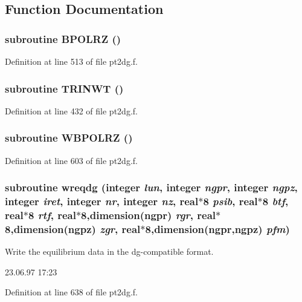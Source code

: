 \subsection{Function Documentation}
\hypertarget{pt2dg_8f_6512103c7c194607f9a5868f70673f38}{
\subsubsection[BPOLRZ]{\setlength{\rightskip}{0pt plus 5cm}subroutine BPOLRZ ()}}
\label{pt2dg_8f_6512103c7c194607f9a5868f70673f38}




Definition at line 513 of file pt2dg.f.\hypertarget{pt2dg_8f_b954ece6618d5879ab91cf37b0735a5a}{
\subsubsection[TRINWT]{\setlength{\rightskip}{0pt plus 5cm}subroutine TRINWT ()}}
\label{pt2dg_8f_b954ece6618d5879ab91cf37b0735a5a}




Definition at line 432 of file pt2dg.f.\hypertarget{pt2dg_8f_a8661f7bb97ebf7d6b7eb7389a5bfe41}{
\subsubsection[WBPOLRZ]{\setlength{\rightskip}{0pt plus 5cm}subroutine WBPOLRZ ()}}
\label{pt2dg_8f_a8661f7bb97ebf7d6b7eb7389a5bfe41}




Definition at line 603 of file pt2dg.f.\hypertarget{pt2dg_8f_9b1f405bcdbc8d49e53245d70506b459}{
\subsubsection[wreqdg]{\setlength{\rightskip}{0pt plus 5cm}subroutine wreqdg (integer {\em lun}, \/  integer {\em ngpr}, \/  integer {\em ngpz}, \/  integer {\em iret}, \/  integer {\em nr}, \/  integer {\em nz}, \/  real$\ast$8 {\em psib}, \/  real$\ast$8 {\em btf}, \/  real$\ast$8 {\em rtf}, \/  real$\ast$8,dimension(ngpr) {\em rgr}, \/  real$\ast$8,dimension(ngpz) {\em zgr}, \/  real$\ast$8,dimension(ngpr,ngpz) {\em pfm})}}
\label{pt2dg_8f_9b1f405bcdbc8d49e53245d70506b459}


Write the equilibrium data in the dg-compatible format. 

\begin{Desc}
\item[Version:]23.06.97 17:23 \end{Desc}


Definition at line 638 of file pt2dg.f.